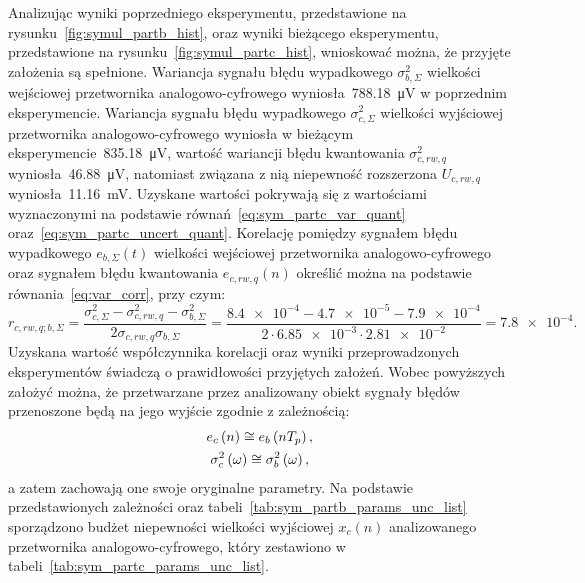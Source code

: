 Analizując wyniki poprzedniego eksperymentu, przedstawione na rysunku~\ref{fig:symul_partb_hist}, oraz wyniki bieżącego eksperymentu, przedstawione na rysunku~\ref{fig:symul_partc_hist}, wnioskować można, że przyjęte założenia są spełnione. Wariancja sygnału błędu wypadkowego $\sigma_{b,\Sigma}^{2}$ wielkości wejściowej przetwornika analogowo-cyfrowego wyniosła~\qty{788.18}{\micro V} w poprzednim eksperymencie. Wariancja sygnału błędu wypadkowego $\sigma_{c,\Sigma}^{2}$ wielkości wyjściowej przetwornika analogowo-cyfrowego wyniosła w bieżącym eksperymencie~\qty{835.18}{\micro V}, wartość wariancji błędu kwantowania $\sigma_{c,rw,q}^{2}$ wyniosła~\qty{46.88}{\micro V}, natomiast związana z nią niepewność rozszerzona $U_{c,rw,q}$ wyniosła~\qty{11.16}{mV}. Uzyskane wartości pokrywają się z wartościami wyznaczonymi na podstawie równań~\eqref{eq:sym_partc_var_quant} oraz~\eqref{eq:sym_partc_uncert_quant}. Korelację pomiędzy sygnałem błędu wypadkowego $e_{b,\Sigma}(t)$ wielkości wejściowej przetwornika analogowo-cyfrowego oraz sygnałem błędu kwantowania $e_{c,rw,q}(n)$ określić można na podstawie równania~\eqref{eq:var_corr}, przy czym:
\begin{equation}
r_{c,rw,q;b,\Sigma} = \frac{\sigma_{c,\Sigma}^{2} - \sigma_{c,rw,q}^{2} - \sigma_{b,\Sigma}^{2}}{2 \sigma_{c,rw,q} \sigma_{b,\Sigma}} = \frac{\num{8.4e-4} - \num{4.7e-5} - \num{7.9e-4}}{2 \cdot \num{6.85e-3} \cdot \num{2.81e-2}} = \num{7.8e-4} \label{eq:sym_partc_corr}.
\end{equation}
Uzyskana wartość współczynnika korelacji oraz wyniki przeprowadzonych eksperymentów świadczą o prawidłowości przyjętych założeń. Wobec powyższych założyć można, że przetwarzane przez analizowany obiekt sygnały błędów przenoszone będą na jego wyjście zgodnie z zależnością:
\begin{gather}
e_{c} \left(n\right) \cong e_{b} \left(nT_{p}\right) \label{eq:sym_partc_err_prop}, \\
\sigma_{c}^{2} \left(\omega\right) \cong \sigma_{b}^{2} \left(\omega\right) \label{eq:sym_partc_var_prop},
\end{gather}
a zatem zachowają one swoje oryginalne parametry. Na podstawie przedstawionych zależności oraz tabeli~\ref{tab:sym_partb_params_unc_list} sporządzono budżet niepewności wielkości wyjściowej $x_{c}(n)$ analizowanego przetwornika analogowo-cyfrowego, który zestawiono w tabeli~\ref{tab:sym_partc_params_unc_list}.

